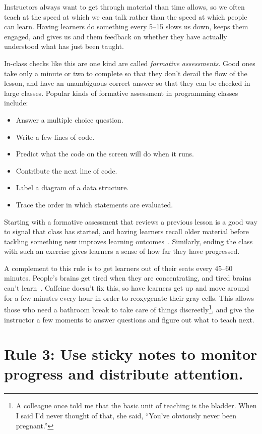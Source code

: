 \documentclass[10pt,letterpaper]{article}
\newcommand{\rulemajor}[1]{\section{#1}}
\begin{document}
Instructors always want to get through material than time allows,
so we often teach at the speed at which we can talk
rather than the speed at which people can learn.
Having learners do something every 5--15 slows us down,
keeps them engaged,
and gives us and them feedback on whether they have actually understood
what has just been taught.

In-class checks like this are one kind are called \emph{formative assessments}.
Good ones take only a minute or two to complete so that they don't derail the flow of the lesson,
and have an unambiguous correct answer so that they can be checked in large classes.
Popular kinds of formative assessment in programming classes include:

\begin{itemize}
  \item Answer a multiple choice question.
  \item Write a few lines of code.
  \item Predict what the code on the screen will do when it runs.
  \item Contribute the next line of code.
  \item Label a diagram of a data structure.
  \item Trace the order in which statements are evaluated.
\end{itemize}

Starting with a formative assessment that reviews a previous lesson
is a good way to signal that class has started,
and having learners recall older material before tackling something new
improves learning outcomes~\cite{Wein2018b}.
Similarly,
ending the class with such an exercise
gives learners a sense of how far they have progressed.

A complement to this rule is to get learners out of their seats every 45--60 minutes.
People's brains get tired when they are concentrating,
and tired brains can't learn~\cite{HPL2}.
Caffeine doesn't fix this,
so have learners get up and move around for a few minutes every hour
in order to reoxygenate their gray cells.
This allows those who need a bathroom break to take care of things discreetly\footnote{A colleague once told me that
the basic unit of teaching is the bladder.
When I said I'd never thought of that,
she said, ``You've obviously never been pregnant.''},
and give the instructor a few moments to answer questions
and figure out what to teach next.

\rulemajor{Rule 3: Use sticky notes to monitor progress and distribute attention.}
\end{document}
